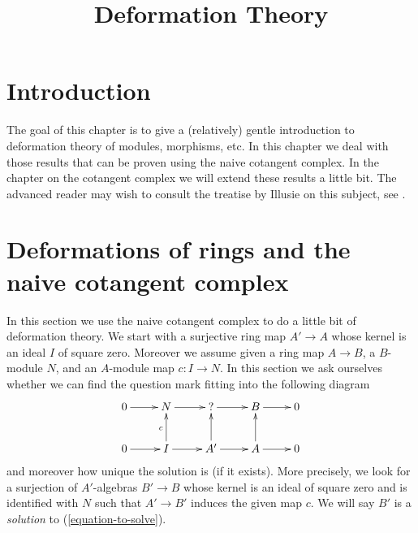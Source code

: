 \documentclass{stacks-project}
\theoremstyle{plain}
\theoremstyle{definition}
\theoremstyle{remark}
\numberwithin{equation}{subsection}
\begin{document}
\title{Deformation Theory}


\maketitle

\label{section-phantom}

\tableofcontents

\section{Introduction}
\label{section-introduction}

\noindent
The goal of this chapter is to give a (relatively) gentle introduction to
deformation theory of modules, morphisms, etc. In this chapter we deal with
those results that can be proven using the naive cotangent complex. In
the chapter on the cotangent complex we will extend these results a little
bit. The advanced reader may wish to consult the treatise by Illusie on this
subject, see \cite{cotangent}.





\section{Deformations of rings and the naive cotangent complex}
\label{section-deformations}

\noindent
In this section we use the naive cotangent complex to do a little bit
of deformation theory. We start with a surjective ring map $A' \to A$
whose kernel is an ideal $I$ of square zero. Moreover we assume
given a ring map $A \to B$, a $B$-module $N$, and an $A$-module map
$c : I \to N$. In this section we ask ourselves whether we can find
the question mark fitting into the following diagram
\begin{equation}
\label{equation-to-solve}
\vcenter{
\xymatrix{
0 \ar[r] & N \ar[r] & {?} \ar[r] & B \ar[r] & 0 \\
0 \ar[r] & I \ar[u]^c \ar[r] & A' \ar[u] \ar[r] & A \ar[u] \ar[r] & 0
}
}
\end{equation}
and moreover how unique the solution is (if it exists). More precisely,
we look for a surjection of $A'$-algebras $B' \to B$ whose kernel is
an ideal of square zero and is
identified with $N$ such that $A' \to B'$ induces the given map $c$.
We will say $B'$ is a {\it solution} to (\ref{equation-to-solve}).
\end{document}
